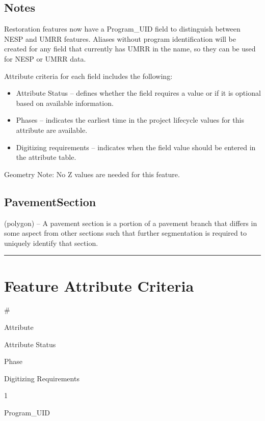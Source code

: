 \documentclass[
  letterpaper,
  DIV=11,
  numbers=noendperiod]{scrreprt}
\providecommand{\tightlist}{%
  \setlength{\itemsep}{0pt}\setlength{\parskip}{0pt}}
\begin{document}
\subsection{Notes}\label{notes-25}

Restoration features now have a Program\_UID field to distinguish
between NESP and UMRR features. Aliases without program identification
will be created for any field that currently has UMRR in the name, so
they can be used for NESP or UMRR data.

Attribute criteria for each field includes the following:

\begin{itemize}
\tightlist
\item
  Attribute Status -- defines whether the field requires a value or if
  it is optional based on available information.
\item
  Phases -- indicates the earliest time in the project lifecycle values
  for this attribute are available.
\item
  Digitizing requirements -- indicates when the field value should be
  entered in the attribute table.
\end{itemize}

Geometry Note: No Z values are needed for this feature.

\subsection{PavementSection}\label{pavementsection}

(polygon) -- A pavement section is a portion of a pavement branch that
differs in some aspect from other sections such that further
segmentation is required to uniquely identify that section.

\begin{center}\rule{0.5\linewidth}{0.5pt}\end{center}

\section{Feature Attribute
Criteria}\label{feature-attribute-criteria-22}

\#

Attribute

Attribute Status

Phase

Digitizing Requirements

1

Program\_UID
\end{document}
